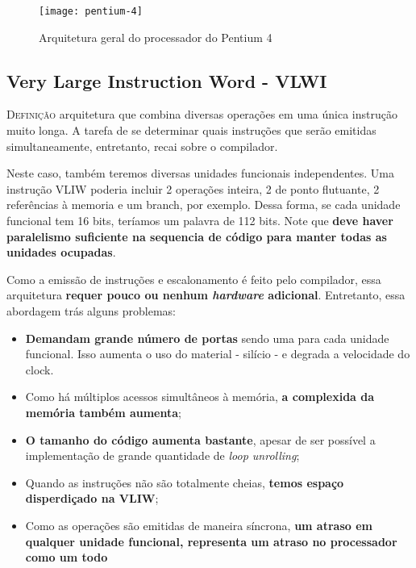 \begin{figure}[ht]
  \centering
  \texttt{[image: pentium-4]}
  \caption{Arquitetura geral do processador do Pentium 4  }
  \label{fig:pentium4}
\end{figure}


\subsection{Very Large Instruction Word - VLWI}
\textsc{Definição} arquitetura que combina diversas operações em uma única instrução muito longa. A tarefa de se determinar quais instruções que serão emitidas simultaneamente, entretanto, recai sobre o compilador.

Neste caso, também teremos diversas unidades funcionais independentes. Uma instrução VLIW poderia incluir 2 operações inteira, 2 de ponto flutuante, 2 referências à memoria e um branch, por exemplo. Dessa forma, se cada unidade funcional tem 16 bits, teríamos um palavra de 112 bits. Note que \textbf{deve haver paralelismo suficiente na sequencia de código para manter todas as unidades ocupadas}.

Como a emissão de instruções e escalonamento é feito pelo compilador, essa arquitetura \textbf{requer pouco ou nenhum \textit{hardware} adicional}. Entretanto, essa abordagem trás alguns problemas:
\begin{itemize}
  \item \textbf{Demandam grande número de portas} sendo uma para cada unidade funcional. Isso aumenta o uso do material - silício - e degrada a velocidade do clock.

  \item Como há múltiplos acessos simultâneos à memória, \textbf{a complexida da memória também aumenta};

  \item \textbf{O tamanho do código aumenta bastante}, apesar de ser possível a implementação de grande quantidade de \textit{loop unrolling};

  \item Quando as instruções não são totalmente cheias, \textbf{temos espaço disperdiçado na VLIW};

  \item Como as operações são emitidas de maneira síncrona, \textbf{um atraso em qualquer unidade funcional, representa um atraso no processador como um todo}
\end{itemize}





